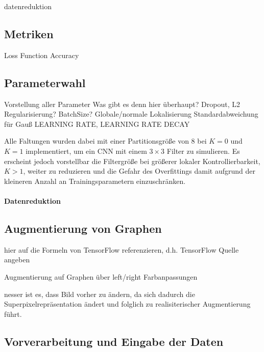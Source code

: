 

datenreduktion

\subsection{Metriken}
\label{metriken}

Loss Function
Accuracy

\subsection{Parameterwahl}
\label{parameterwahl}

Vorstellung aller Parameter
Was gibt es denn hier überhaupt?
Dropout, L2 Regularisierung?
BatchSize?
Globale/normale Lokalisierung
Standardabweichung für Gauß
LEARNING RATE, LEARNING RATE DECAY

Alle Faltungen wurden dabei mit einer Partitionsgröße von $8$ bei $K=0$ und $K=1$ implementiert, um ein \gls{CNN} mit einem $3 \times 3$ Filter zu simulieren.
Es erscheint jedoch vorstellbar die Filtergröße bei größerer lokaler Kontrollierbarkeit, \dhe{} $K > 1$, weiter zu reduzieren und die Gefahr des Overfittings damit aufgrund der kleineren Anzahl an Trainingsparametern einzuschränken.

\paragraph{Datenreduktion}
\label{datenreduktion}

\subsection{Augmentierung von Graphen}
\label{augmentierung_von_graphen}

hier auf die Formeln von TensorFlow referenzieren, d.h. TensorFlow Quelle angeben
\cite{tensorflow}

Augmentierung auf Graphen über left/right
Farbanpassungen


nesser ist es, dass Bild vorher zu ändern, da sich dadurch die Superpixelrepräsentation ändert
und folglich zu realisiterischer Augmentierung führt.

\subsection{Vorverarbeitung und Eingabe der Daten}
\label{vorverarbeitung}
